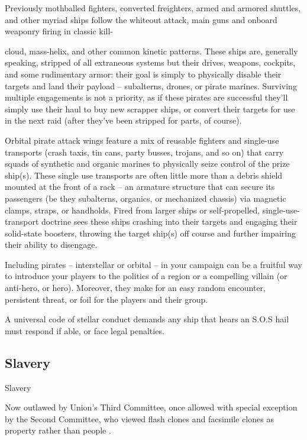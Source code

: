 Previously mothballed fighters, converted freighters, armed and armored shuttles, and other  
myriad ships follow the whiteout attack, main guns and onboard weaponry firing in classic kill- 

                                                                                                                      


cloud, mass-helix, and other common kinetic patterns. These ships are, generally speaking,  
stripped of all extraneous systems but their drives, weapons, cockpits, and some rudimentary  
armor: their goal is simply to physically disable their targets and land their payload -- subalterns,  
drones, or pirate marines. Surviving multiple engagements is not a priority, as if these pirates are  
successful they’ll simply use their haul to buy new scrapper ships, or convert their targets for use  
in the next raid (after they’ve been stripped for parts, of course).   

Orbital pirate attack wings feature a mix of reusable fighters and single-use transports (crash  
taxis, tin cans, party busses, trojans, and so on) that carry squads of synthetic and organic  
marines to physically seize control of the prize ship(s). These single use transports are often little  
more than a debris shield mounted at the front of a rack -- an armature structure that can secure  
its passengers (be they subalterns, organics, or mechanized chassis) via magnetic clamps,  
straps, or handholds. Fired from larger ships or self-propelled, single-use-transport doctrine sees  
these ships crashing into their targets and engaging their solid-state boosters, throwing the target  
ship(s) off course and further impairing their ability to disengage.   

Including pirates -- interstellar or orbital -- in your campaign can be a fruitful way to introduce your  
players to the politics of a region or a compelling villain (or anti-hero, or hero). Moreover, they  
make for an easy random encounter, persistent threat, or foil for the players and their group.    

A universal code of stellar conduct demands any ship that hears an S.O.S hail must respond if  
able, or face legal penalties.
 
\subsection{Slavery}
Slavery  

Now outlawed by Union’s Third Committee, once allowed with special exception by the Second  
Committee, who viewed flash clones and facsimile clones as property rather than people .  
 

